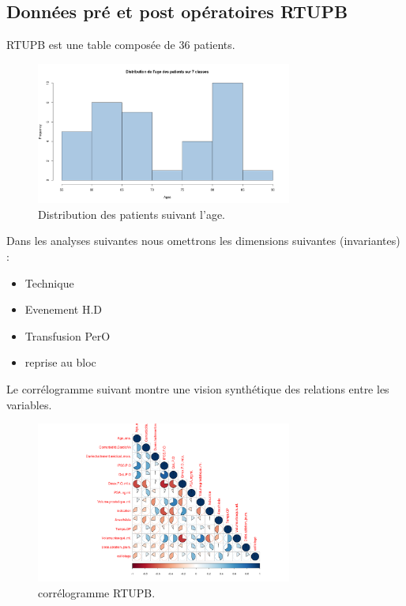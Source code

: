 \subsection{Données pré et post opératoires RTUPB}

RTUPB est une table composée de 36 patients. 
	
\begin{figure}[!h]
\centering
\includegraphics[width=0.75\textwidth]{../Fig/RTUPB/rtupb-age-frequency.png}
\caption{Distribution des patients suivant l'age.}
\end{figure}

Dans les analyses suivantes nous omettrons les dimensions suivantes  (invariantes)  :  
\begin{itemize}
\item Technique
\item Evenement H.D
\item Transfusion PerO
\item reprise au bloc 
\end{itemize}

Le corrélogramme suivant montre une vision synthétique des relations  entre les variables.
\begin{figure}[!h]
\centering
\includegraphics[width=0.75\textwidth]{../Fig/RTUPB/rtupb-matrice-cor-graph.png}
\caption{corrélogramme RTUPB.}
\end{figure}

